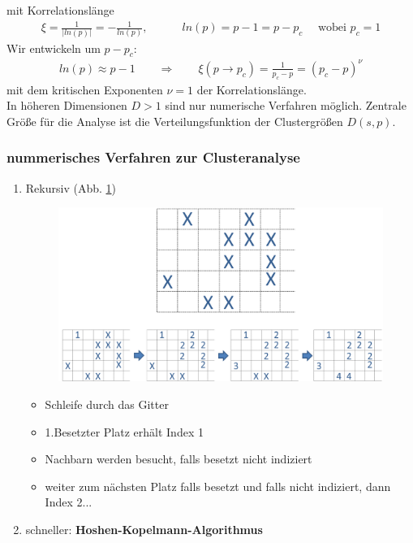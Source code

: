 \documentclass[12pt]{article}
\begin{document}
 	mit Korrelationslänge
 	\begin{align*}
 	\xi = \frac{1}{\vert ln(p) \vert} = -\frac{1}{ln(p)}, \quad \quad \quad ln(p)= p-1= p-p_c \quad \mbox{ wobei } p_c=1
\end{align*}
Wir entwickeln um $p-p_c$: \begin{align*}
ln(p) \approx p-1  \quad \quad \Rightarrow \quad \quad  \xi (p \to p_c) = \frac{1}{p_c-p}= (p_c - p)^\nu 
\end{align*}
 	mit dem kritischen Exponenten $\nu =1$ der Korrelationslänge. \\
 	
 	In höheren Dimensionen $D>1$ sind nur numerische Verfahren möglich. Zentrale Größe für die Analyse ist die Verteilungsfunktion der Clustergrößen $D(s,p)$.
 	\subsubsection{nummerisches Verfahren zur Clusteranalyse}
 	
 	 		\begin{enumerate}
 		\item Rekursiv (Abb. \ref{fig:hello})
 		\begin{figure}[ht]
\centering
\includegraphics[width=\textwidth]{hello.png}
	\caption{}
	\label{fig:hello}
\end{figure}
 		
 			\begin{itemize}
 			\item Schleife durch das Gitter
 			\item 1.Besetzter Platz erhält Index 1
 			\item Nachbarn werden besucht, falls besetzt nicht indiziert
 			\item weiter zum nächsten Platz falls besetzt und falls nicht indiziert, dann Index 2...
 			\end{itemize}
 			
 		\item schneller: \textbf{Hoshen-Kopelmann-Algorithmus}
 		
\end{enumerate} 	
\end{document}
